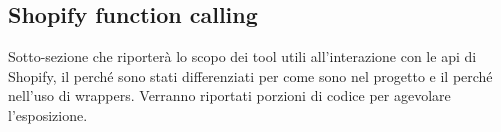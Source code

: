 \subsection{Shopify function calling}

Sotto-sezione che riporterà lo scopo dei tool utili all'interazione con le api di Shopify, il perché sono stati differenziati per come sono nel progetto e il perché nell'uso di wrappers.
Verranno riportati porzioni di codice per agevolare l'esposizione.
